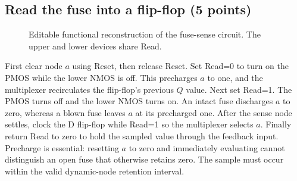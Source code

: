 \subsection{Read the fuse into a flip-flop (5 points)}
\begin{figure}[ht]\centering
{}
\caption{Editable functional reconstruction of the fuse-sense circuit. The upper and lower devices share Read.}
\end{figure}
\answer First clear node $a$ using Reset, then release Reset. Set Read=0 to turn on the PMOS while the lower NMOS is off. This precharges $a$ to one, and the multiplexer recirculates the flip-flop's previous $Q$ value. Next set Read=1. The PMOS turns off and the lower NMOS turns on. An intact fuse discharges $a$ to zero, whereas a blown fuse leaves $a$ at its precharged one. After the sense node settles, clock the D flip-flop while Read=1 so the multiplexer selects $a$. Finally return Read to zero to hold the sampled value through the feedback input. Precharge is essential: resetting $a$ to zero and immediately evaluating cannot distinguish an open fuse that otherwise retains zero. The sample must occur within the valid dynamic-node retention interval.
